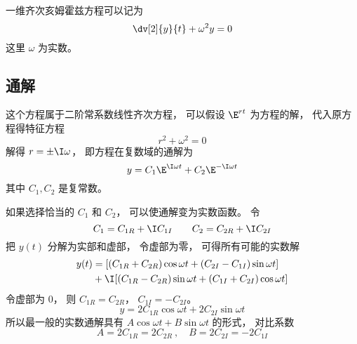 
\begin{issues}
\issueNeedCite
\end{issues}


一维齐次亥姆霍兹方程可以记为
\begin{equation}
\dv[2]{y}{t} + \omega^2 y = 0
\end{equation}
这里 $\omega$ 为实数。

\subsection{通解}
这个方程属于二阶常系数线性齐次方程， 可以假设 $\E^{rt}$ 为方程的解， 代入原方程得特征方程
\begin{equation}
r^2 + \omega^2 = 0
\end{equation}
解得 $r = \pm \I \omega$， 即方程在复数域的通解为
\begin{equation}
y = C_1 \E^{\I\omega t} + C_2 \E^{-\I\omega t}
\end{equation}
其中 $C_1, C_2$ 是复常数。

如果选择恰当的 $C_1$ 和 $C_2$， 可以使通解变为实数函数。 令
\begin{equation}
C_1 = C_{1R} + \I C_{1I} \qquad
C_2 = C_{2R} + \I C_{2I}
\end{equation}
把 $y(t)$ 分解为实部和虚部， 令虚部为零， 可得所有可能的实数解
\begin{equation}\label{eq_HmhzEq_1}
\begin{aligned}
y(t) &= [(C_{1R} + C_{2R}) \cos\omega t + (C_{2I} - C_{1I}) \sin\omega t] \\
& + \I [(C_{1R} - C_{2R}) \sin \omega t + (C_{1I} + C_{2I}) \cos \omega t]
\end{aligned}
\end{equation}
令虚部为 $0$， 则 $C_{1R} = C_{2R}$， $C_{1I} = -C_{2I}$。
\begin{equation}
y = 2C_{1R}\cos\omega t + 2C_{2I}\sin\omega t
\end{equation}
所以最一般的实数通解具有 $A\cos\omega t + B\sin\omega t$ 的形式， 对比系数
\begin{equation}
A = 2C_{1R} = 2C_{2R}~,\quad B = 2C_{2I} = -2C_{1I}
\end{equation}
